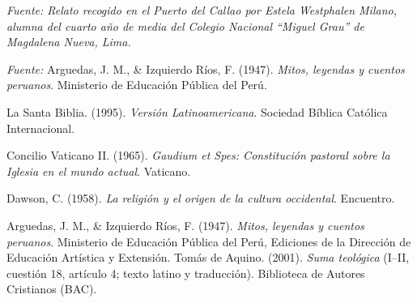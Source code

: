 \documentclass[a4paper,12pt]{article}
\begin{document}
\vspace{3mm}
\noindent\textit{Fuente: Relato recogido en el Puerto del Callao por Estela Westphalen Milano, alumna del cuarto año de media del Colegio Nacional “Miguel Grau” de Magdalena Nueva, Lima.}

\vspace{3mm}
\noindent\textit{Fuente:} Arguedas, J. M., \& Izquierdo Ríos, F. (1947). \textit{Mitos, leyendas y cuentos peruanos}. Ministerio de Educación Pública del Perú.

\newpage	
	
	\begin{thebibliography}{9}
		
		La Santa Biblia. (1995). \textit{Versión Latinoamericana}. Sociedad Bíblica Católica Internacional.
		
		Concilio Vaticano II. (1965). \textit{Gaudium et Spes: Constitución pastoral sobre la Iglesia en el mundo actual}. Vaticano.
		
		Dawson, C. (1958). \textit{La religión y el origen de la cultura occidental}. Encuentro.
		
		Arguedas, J. M., \& Izquierdo Ríos, F. (1947). \textit{Mitos, leyendas y cuentos peruanos}. Ministerio de Educación Pública del Perú, Ediciones de la Dirección de Educación Artística y Extensión.
		 Tomás de Aquino. (2001). \textit{Suma teológica} (I–II, cuestión 18, artículo 4; texto latino y traducción). Biblioteca de Autores Cristianos (BAC).


		
	\end{thebibliography}
	
\end{document}
